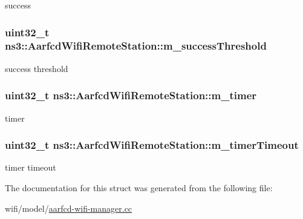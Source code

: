 success 

\subsubsection[{\texorpdfstring{m\+\_\+success\+Threshold}{m_successThreshold}}]{\setlength{\rightskip}{0pt plus 5cm}uint32\+\_\+t ns3\+::\+Aarfcd\+Wifi\+Remote\+Station\+::m\+\_\+success\+Threshold}\hypertarget{structns3_1_1AarfcdWifiRemoteStation_a4e438396260a93d5457dd61f6af2ab7b}{}\label{structns3_1_1AarfcdWifiRemoteStation_a4e438396260a93d5457dd61f6af2ab7b}


success threshold 

\subsubsection[{\texorpdfstring{m\+\_\+timer}{m_timer}}]{\setlength{\rightskip}{0pt plus 5cm}uint32\+\_\+t ns3\+::\+Aarfcd\+Wifi\+Remote\+Station\+::m\+\_\+timer}\hypertarget{structns3_1_1AarfcdWifiRemoteStation_a4e877457449bf8ecfd1aa59fda87256d}{}\label{structns3_1_1AarfcdWifiRemoteStation_a4e877457449bf8ecfd1aa59fda87256d}


timer 

\subsubsection[{\texorpdfstring{m\+\_\+timer\+Timeout}{m_timerTimeout}}]{\setlength{\rightskip}{0pt plus 5cm}uint32\+\_\+t ns3\+::\+Aarfcd\+Wifi\+Remote\+Station\+::m\+\_\+timer\+Timeout}\hypertarget{structns3_1_1AarfcdWifiRemoteStation_ad908ee9e8c0eeb03f699e699d52b2d3a}{}\label{structns3_1_1AarfcdWifiRemoteStation_ad908ee9e8c0eeb03f699e699d52b2d3a}


timer timeout 



The documentation for this struct was generated from the following file\+:\begin{DoxyCompactItemize}
\item 
wifi/model/\hyperlink{aarfcd-wifi-manager_8cc}{aarfcd-\/wifi-\/manager.\+cc}\end{DoxyCompactItemize}

